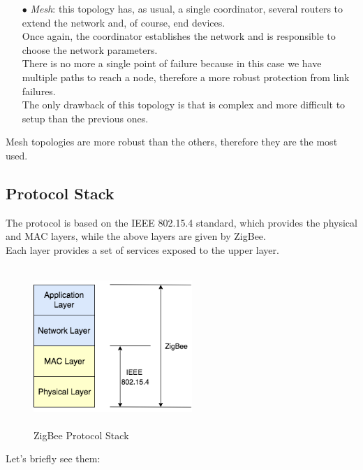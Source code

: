 \documentclass[12pt]{report}
\begin{document}
{{\begin{itemize}
\item[$\bullet$] \emph{Mesh}: this topology has, as usual, a single coordinator, several routers to extend the network and, of course, end devices.\\
Once again, the coordinator establishes the network and is responsible to choose the network parameters.\\
There is no more a single point of failure because in this case we have multiple paths to reach a node, therefore a more robust protection from link failures.\\
The only drawback of this topology is that is complex and more difficult to setup than the previous ones.\\
\end{itemize}

Mesh topologies are more robust than the others, therefore they are the most used.\\

\clearpage
\subsection{Protocol Stack}
\bigskip

The protocol is based on the IEEE 802.15.4 standard, which provides the physical and MAC layers, while the above layers are given by ZigBee.\\
Each layer provides a set of services exposed to the upper layer.

\begin{figure}[H]
\includegraphics[width=6cm,height=6cm,keepaspectratio]{zigbee_stack}
\centering
\caption{ZigBee Protocol Stack}
\end{figure}

Let's briefly see them: 

}}
\end{document}
